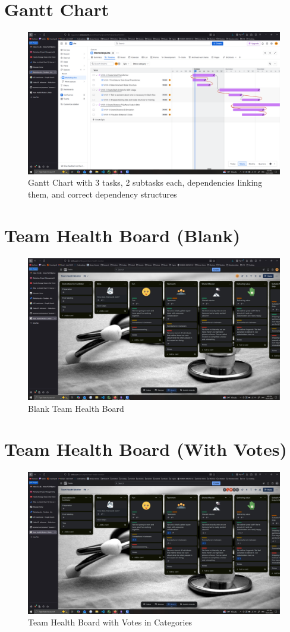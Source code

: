 \documentclass[12pt]{article}
\begin{document}
\section{Gantt Chart}

\begin{figure}[H]
    \centering
    \includegraphics[width=0.75\linewidth]{images/gantt_chart_q3.png}
    \caption{Gantt Chart with 3 tasks, 2 subtasks each, dependencies linking them, and correct dependency structures}
    \label{fig:q3}
\end{figure}

\section{Team Health Board (Blank)}

\begin{figure}[H]
    \centering
    \includegraphics[width=0.75\linewidth]{images/trello_board_q4_actually.jpg}
    \caption{Blank Team Health Board}
    \label{fig:q4}
\end{figure}

\section{Team Health Board (With Votes)}

\begin{figure}[H]
    \centering
    \includegraphics[width=0.75\linewidth]{images/trello_board_q5.jpg}
    \caption{Team Health Board with Votes in Categories}
    \label{fig:q5}
\end{figure}
\end{document}
